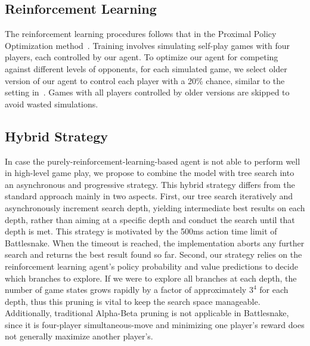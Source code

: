 \documentclass[conference]{IEEEtran}
\begin{document}
\subsection{Reinforcement Learning}

The reinforcement learning procedures follows that in the Proximal Policy
Optimization method~\cite{schulman2017proximal}.
Training involves simulating self-play games with four players,
each controlled by our agent.
To optimize our agent for competing against different levels of opponents,
for each simulated game,
we select older version of our agent to control each player with a 20\% chance,
similar to the setting in~\cite{silver2017mastering}.
Games with all players controlled by older versions are skipped to avoid wasted
simulations.

\subsection{Hybrid Strategy}

In case the purely-reinforcement-learning-based agent is not able to perform
well in high-level game play,
we propose to combine the model with tree search into an
asynchronous and progressive strategy.
This hybrid strategy differs from the standard approach mainly in two aspects.
First, our tree search iteratively and asynchronously increment search depth,
yielding intermediate best results on each depth,
rather than aiming at a specific depth and conduct the search until that depth
is met.
This strategy is motivated by the 500ms action time limit of Battlesnake.
When the timeout is reached,
the implementation aborts any further search and returns the best result found
so far. Second,
our strategy relies on the reinforcement learning agent's policy probability and
value predictions to decide which branches to explore.
If we were to explore all branches at each depth,
the number of game states grows rapidly by a factor of approximately $3^4$ for
each depth, thus this pruning is vital to keep the search space manageable.
Additionally, traditional Alpha-Beta pruning is not applicable in Battlesnake,
since it is four-player simultaneous-move and minimizing one player's reward
does not generally maximize another player's.
\end{document}
